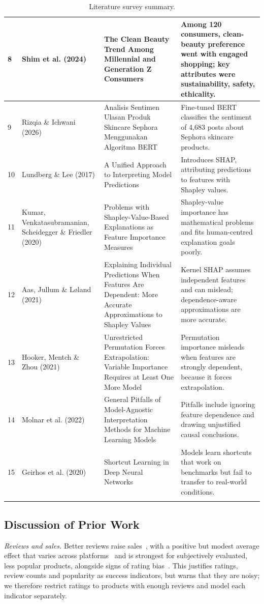 \documentclass[11pt,a4paper]{article}
\begin{document}
\begin{longtable}{|p{0.55cm}|p{3.0cm}|p{5.9cm}|p{6.5cm}|}
8 & Shim et al. (2024) & The Clean Beauty Trend Among Millennial and Generation Z Consumers & Among 120 consumers, clean-beauty preference went with engaged shopping; key attributes were sustainability, safety, ethicality. \\ \hline
9 & Rizqia \& Ichwani (2026) & Analisis Sentimen Ulasan Produk Skincare Sephora Menggunakan Algoritma BERT & Fine-tuned BERT classifies the sentiment of 4,683 posts about Sephora skincare products. \\ \hline
10 & Lundberg \& Lee (2017) & A Unified Approach to Interpreting Model Predictions & Introduces SHAP, attributing predictions to features with Shapley values. \\ \hline
11 & Kumar, Venkatasubramanian, Scheidegger \& Friedler (2020) & Problems with Shapley-Value-Based Explanations as Feature Importance Measures & Shapley-value importance has mathematical problems and fits human-centred explanation goals poorly. \\ \hline
12 & Aas, Jullum \& L{\o}land (2021) & Explaining Individual Predictions When Features Are Dependent: More Accurate Approximations to Shapley Values & Kernel SHAP assumes independent features and can mislead; dependence-aware approximations are more accurate. \\ \hline
13 & Hooker, Mentch \& Zhou (2021) & Unrestricted Permutation Forces Extrapolation: Variable Importance Requires at Least One More Model & Permutation importance misleads when features are strongly dependent, because it forces extrapolation. \\ \hline
14 & Molnar et al. (2022) & General Pitfalls of Model-Agnostic Interpretation Methods for Machine Learning Models & Pitfalls include ignoring feature dependence and drawing unjustified causal conclusions. \\ \hline
15 & Geirhos et al. (2020) & Shortcut Learning in Deep Neural Networks & Models learn shortcuts that work on benchmarks but fail to transfer to real-world conditions. \\ \hline
\caption{Literature survey summary.}
\label{tab:survey}
\end{longtable}
\endgroup

\subsection{Discussion of Prior Work}
\emph{Reviews and sales.} Better reviews raise sales~\cite{chevalier2006}, with a positive but modest average effect that varies across platforms~\cite{babic2016} and is strongest for subjectively evaluated, less popular products, alongside signs of rating bias~\cite{moen2017}. This justifies ratings, review counts and popularity as success indicators, but warns that they are noisy; we therefore restrict ratings to products with enough reviews and model each indicator separately.
\end{document}
